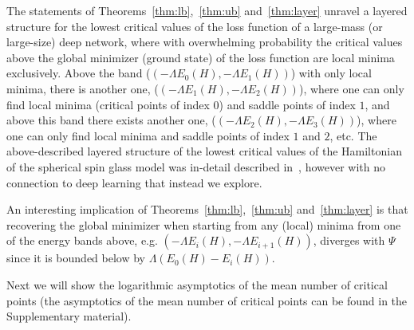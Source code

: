 \documentclass[twoside]{article}
\begin{document}
The statements of Theorems~\ref{thm:lb},~\ref{thm:ub} and~\ref{thm:layer} unravel a layered structure for the lowest critical values of the loss function of a large-mass (or large-size) deep network, where with overwhelming probability the critical values above the global minimizer (ground state) of the loss function are local minima exclusively. Above the band ($\left(-\Lambda E_0(H),-\Lambda E_1(H)\right)$) with only local minima, there is another one, ($\left(-\Lambda E_1(H),-\Lambda E_2(H)\right)$), where one can only find local minima (critical points of index $0$) and saddle points of index $1$, and above this band there exists another one, ($\left(-\Lambda E_2(H),-\Lambda E_3(H)\right)$), where one can only find local minima and saddle points of index $1$ and $2$, etc. The above-described layered structure of the lowest critical values of the Hamiltonian of the spherical spin glass model was in-detail described in~\cite{AAC2010}, however with no connection to deep learning that instead we explore. 

An interesting implication of Theorems~\ref{thm:lb},~\ref{thm:ub} and~\ref{thm:layer} is that recovering the global minimizer when starting from any (local) minima from one of the energy bands above, e.g. $\left(-\Lambda E_i(H),-\Lambda E_{i+1}(H)\right)$, diverges with $\Psi$ since it is bounded below by $\Lambda (E_0(H) - E_i(H))$. 

Next we will show the logarithmic asymptotics of the mean number of critical points (the asymptotics of the mean number of critical points can be found in the Supplementary material).
\end{document}
